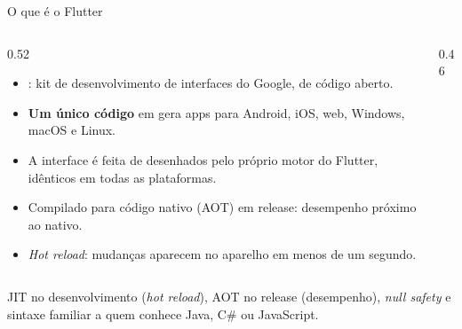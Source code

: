 \documentclass[aspectratio=169,10pt]{beamer}
\begin{document}
\begin{frame}{O que é o Flutter}
  \begin{columns}[c]
    \begin{column}{0.52\textwidth}
      \begin{itemize}
        \item {}: kit de desenvolvimento de interfaces do Google, de código aberto.
        \item \textbf{Um único código} em  gera apps para Android, iOS, web, Windows, macOS e Linux.
        \item A interface é feita de  desenhados pelo próprio motor do Flutter, idênticos em todas as plataformas.
        \item Compilado para código nativo (AOT) em release: desempenho próximo ao nativo.
        \item \emph{Hot reload}: mudanças aparecem no aparelho em menos de um segundo.
      \end{itemize}
    \end{column}
    \begin{column}{0.46\textwidth}
      \centering
    \end{column}
  \end{columns}
  \begin{dica}
    JIT no desenvolvimento (\emph{hot reload}), AOT no release (desempenho), \emph{null safety} e sintaxe familiar a quem conhece Java, C\# ou JavaScript.
  \end{dica}
\end{frame}

\end{document}
